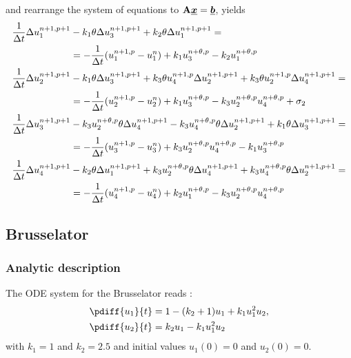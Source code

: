 and rearrange the system of equations to $\mbox{\boldmath ${\mathrm{A}}$}\mbox{\boldmath $\underline{x}$}=\mbox{\boldmath $\underline{b}$}$, yields
\begin{align}
    \frac{1}{\Delta t}\Delta u_1^{n+1, p+1} &  - k_1  \theta \Delta u_3^{n+1, p+1} + k_2  \theta \Delta u_1^{n+1, p+1}  =
    \nonumber \\*
    & = - \frac{1}{\Delta t}(u_1^{n+1,p} - u_1^n) + k_1 u_3^{n+\theta,p} - k_2 u_1^{n+\theta,p}
    \\
    \frac{1}{\Delta t}\Delta u_2^{n+1, p+1} & - k_1 \theta \Delta u_3^{n+1, p+1}
    + k_3 \theta u_4^{n+1,p} \Delta u_2^{n+1, p+1} + k_3 \theta u_2^{n+1,p} \Delta u_4^{n+1, p+1}  =
    \nonumber \\*
    & = - \frac{1}{\Delta t}(u_2^{n+1,p} - u_2^n) + k_1 u_3^{n+\theta,p} - k_3 u_2^{n+\theta,p} u_4^{n+\theta,p} +\sigma_2
    \\
    \frac{1}{\Delta t}\Delta u_3^{n+1, p+1} & - k_3 u_2^{n+\theta,p} \theta \Delta u_4^{n+1, p+1} - k_3 u_4^{n+\theta,p} \theta \Delta u_2^{n+1, p+1} + k_1 \theta \Delta u_3^{n+1, p+1}  =
    \nonumber \\*
    & = - \frac{1}{\Delta t}(u_3^{n+1,p} - u_3^n) + k_3 u_2^{n+\theta,p} u_4^{n+\theta,p} - k_1 u_3^{n+\theta,p}
    \\
    \frac{1}{\Delta t}\Delta u_4^{n+1, p+1}&  - k_2 \theta \Delta u_1^{n+1, p+1}  + k_3 u_2^{n+\theta,p}\theta \Delta u_4^{n+1, p+1} +k_3 u_4^{n+\theta,p} \theta \Delta u_2^{n+1, p+1} =
    \nonumber \\*
    & = - \frac{1}{\Delta t}(u_4^{n+1,p} - u_4^n) + k_2 u_1^{n+\theta,p} - k_3 u_2^{n+\theta,p} u_4^{n+\theta,p}
\end{align}
\subsection{Brusselator}\label{sec:brusselator}
\subsubsection{Analytic description}
The  ODE system for the Brusselator reads \citet[eq.\ 14,15]{AultHolmgreen2003}:
\begin{subequations}
\begin{align}
    \pdiff{u_1}{t} & = 1 - (k_2 + 1) u_1 + k_1 u_1^2 u_2,
    \\
    \pdiff{u_2}{t} & = k_2 u_1 - k_1 u_1^2 u_2
\end{align}
\label{eq:brusselator}
\end{subequations}
with $k_1 =1$ and  $k_2 = 2.5$ and initial values  $u_1(0)=0$ and $u_2(0) = 0$.
